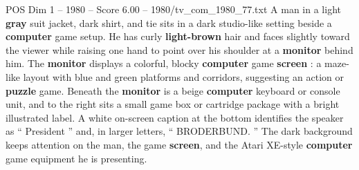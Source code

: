 \begin{textsample}{POS Dim 1 – 1980 – Score 6.00 – 1980/tv\_com\_1980\_77.txt}  \label{ex:f1_pos_060}
A man in a light \textbf{gray} suit jacket, dark shirt, and tie sits in a dark studio-like setting beside a \textbf{computer} game setup.
He has curly \textbf{light-brown} hair and faces slightly toward the viewer while raising one hand to point over his shoulder at a \textbf{monitor} behind him.
The \textbf{monitor} displays a colorful, blocky \textbf{computer} game \textbf{screen} : a maze-like layout with blue and green platforms and corridors, suggesting an action or \textbf{puzzle} game.
Beneath the \textbf{monitor} is a beige \textbf{computer} keyboard or console unit, and to the right sits a small game box or cartridge package with a bright illustrated label.
A white on-screen caption at the bottom identifies the speaker as “ President ” and, in larger letters, “ BRODERBUND. ” The dark background keeps attention on the man, the game \textbf{screen}, and the Atari XE-style \textbf{computer} game equipment he is presenting.

\end{textsample}
